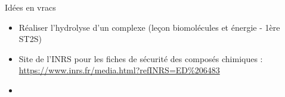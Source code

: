\begin{changemargin}{-1.5cm}{-0cm}
\begin{headerBlock}{Idées en vracs}
\begin{itemize}
    \item Réaliser l'hydrolyse d'un complexe (leçon biomolécules et énergie - 1ère ST2S)
    \item Site de l'INRS pour les fiches de sécurité des composés chimiques : \url{https://www.inrs.fr/media.html?refINRS=ED\%206483}
    \item 
\end{itemize}

\end{headerBlock}
\end{changemargin}

